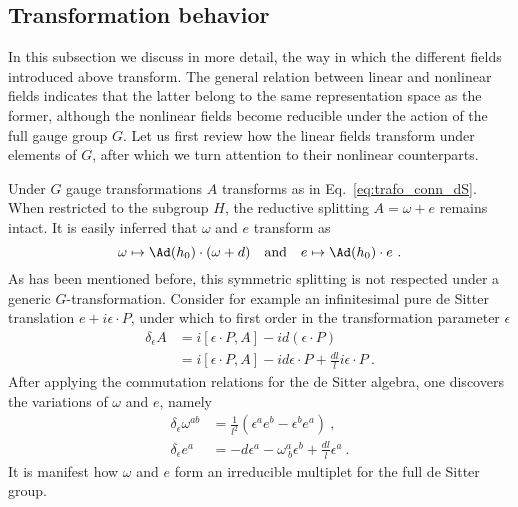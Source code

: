 \documentclass[11pt]{article}
\begin{document}
\subsection{Transformation behavior}
\label{ssec:trafo_beh}

In this subsection we discuss in more detail, the way in which 
the different fields introduced above transform. The general 
relation between linear and nonlinear fields indicates that the 
latter belong to the same representation space as the former, 
although the nonlinear fields become reducible under the action 
of the full gauge group $G$. Let us first review how the linear 
fields transform under elements of $G$, after which we turn 
attention to their nonlinear counterparts.

Under $G$ gauge transformations $A$ transforms as in 
Eq.~\eqref{eq:trafo_conn_dS}. When restricted to the subgroup 
$H$, the reductive splitting $A = \omega + e$ remains intact. It 
is easily inferred that $\omega$ and $e$ transform as
\begin{displaymath}
	\omega \mapsto \Ad(h_0) \cdot (\omega + d)
	\quad	\text{and} \quad
	e \mapsto \Ad(h_0) \cdot e~.
\end{displaymath}
As has been mentioned before, this symmetric splitting is not 
respected under a generic $G$-transformation. Consider for 
example an infinitesimal pure de Sitter translation $e + i 
\epsilon\cdot P$, under which to first order in the 
transformation parameter $\epsilon$
\begin{align*}
	\delta_\epsilon A
		&= i[\epsilon\cdot P,A] -i d(\epsilon\cdot P) \\
		&= i[\epsilon\cdot P,A] -i d\epsilon\cdot P + \frac{dl}{l} 
		i \epsilon\cdot P~.
\end{align*}
After applying the commutation relations for the de Sitter 
algebra, one discovers the variations of $\omega$ and $e$, namely
\begin{subequations}
\begin{align}
	\delta_\epsilon \omega^{ab} &= \frac{1}{l^2}(\epsilon^a e^b - 
	\epsilon^b e^a)~, \\
	\delta_\epsilon e^a &= -d\epsilon^a - \omega^a_{~b}\epsilon^b 
	+ \frac{dl}{l}\epsilon^a~.
\end{align}
\end{subequations}
It is manifest how $\omega$ and $e$ form an irreducible multiplet 
for the full de Sitter group.
\end{document}
